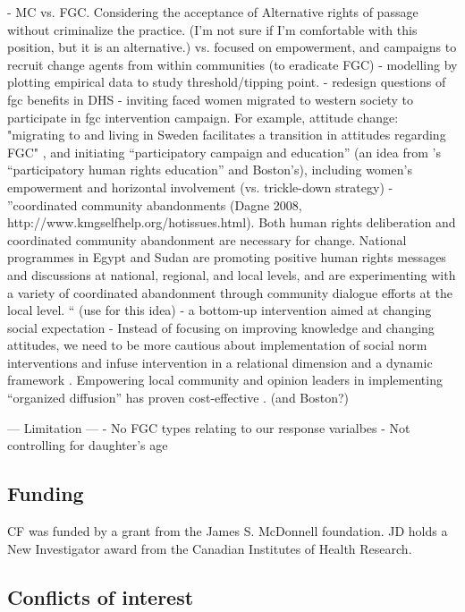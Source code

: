 \documentclass[12pt,]{article}
\begin{document}
- MC vs. FGC.  Considering the acceptance of Alternative rights of passage \cite{GaluKama15} without criminalize the practice. (I'm not sure if I'm comfortable with this position, but it is an alternative.) vs. focused on empowerment, and campaigns to recruit change agents from within communities (to eradicate FGC) \cite{ShelHern13, Will18}
- modelling by plotting empirical data to study threshold/tipping point.
- redesign questions of fgc benefits in DHS
- inviting faced women migrated to western society to participate in fgc intervention campaign.  For example,  attitude change: "migrating to and living in Sweden facilitates a transition in attitudes regarding FGC" \cite{WahlJohn17}, and initiating “participatory campaign and education”  (an idea from ’s “participatory human rights education” and Boston’s), including women’s empowerment and horizontal involvement (vs. trickle-down strategy)
- \cite{MackLeJe08}”coordinated community abandonments (Dagne 2008, http://www.kmgselfhelp.org/hotissues.html). Both human rights deliberation and coordinated community abandonment are necessary for change. National programmes in Egypt and Sudan are promoting positive human rights messages and discussions at national, regional, and local levels, and are experimenting with a variety of coordinated abandonment through community dialogue efforts at the local level. “ (use \cite{Dagn09, MackLeJe08} for this idea)
- a bottom-up intervention aimed at changing social expectation \cite{BiccMari15}
- Instead of focusing on improving knowledge and changing attitudes, we need to be more cautious about implementation of social norm interventions and infuse intervention in a relational dimension and a dynamic framework \cite{CislHeis18a, CislHeis18b, McCh15}.  Empowering local community and opinion leaders in implementing “organized diffusion” \cite{MackLeJe08}has proven cost-effective \cite{CislDenn19}. (and Boston?)


— Limitation —
- No FGC types relating to our response varialbes
- Not controlling for daughter’s age


\subsection{Funding}\label{Funding}

CF was funded by a grant from the James S. McDonnell foundation. JD holds a New Investigator award from the Canadian Institutes of Health Research.

\subsection{Conflicts of interest}\label{Conflicts-of-Interest}
\end{document}
